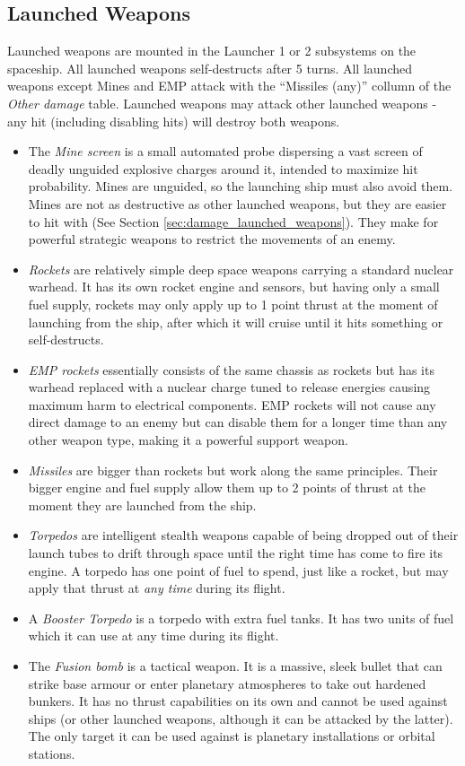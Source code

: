 \documentclass[a4paper,12pt,notitlepage,twocolumn]{article}
\begin{document}
\subsection{Launched Weapons}

Launched weapons are mounted in the Launcher 1 or 2 subsystems on the
spaceship. All launched weapons self-destructs after 5 turns. All
launched weapons except Mines and EMP attack with the ``Missiles (any)''
collumn of the \emph{Other damage} table. Launched weapons may attack
other launched weapons - any hit (including disabling hits) will
destroy both weapons. 

\begin{itemize}
\item The \emph{Mine screen} is a small automated probe dispersing a vast
  screen of deadly unguided explosive charges around it, intended to
  maximize hit probability. Mines are unguided, so the launching ship
  must also avoid them. Mines are not as destructive as other launched
  weapons, but they are easier to hit with (See Section
  \ref{sec:damage_launched_weapons}).  They make for powerful
  strategic weapons to restrict the movements of an enemy. 
\item \emph{Rockets} are relatively simple deep space weapons carrying
  a standard nuclear warhead. It has its own rocket engine and
  sensors, but having only a small fuel supply, rockets may only apply
  up to 1 point thrust at the moment of launching from the ship, after which it
  will cruise until it hits something or self-destructs. 
\item \emph{EMP rockets} essentially consists of the same chassis as
  rockets but has its warhead replaced with a nuclear charge tuned
  to release energies causing maximum harm to electrical
  components. EMP rockets will not cause any direct damage to an enemy
  but can disable them for a longer time 
  than any other weapon type, making it a powerful support weapon.  
\item \emph{Missiles} are bigger than rockets but work along the same
  principles. Their bigger engine and fuel supply allow them up to 2
  points of thrust at the moment they are launched from the ship. 
\item \emph{Torpedos} are intelligent stealth weapons capable of being
  dropped out of their launch tubes to drift through space until the
  right time has come to fire its engine. A torpedo has one point of fuel to spend,
  just like a rocket, but may apply that thrust at \emph{any time} during its
  flight. 
\item A \emph{Booster Torpedo} is a torpedo with extra fuel tanks. It
  has two units of fuel which it can use at any time during its
  flight. 
\item The \emph{Fusion bomb} is a tactical weapon. It is a
  massive, sleek bullet that can strike base armour or 
  enter planetary atmospheres to take out hardened bunkers. It has no thrust
  capabilities on its own and cannot be used against ships (or other
  launched weapons, although it can be attacked by the latter). The
  only target it can be used against is planetary installations or
  orbital stations.  


\end{itemize}
\end{document}
